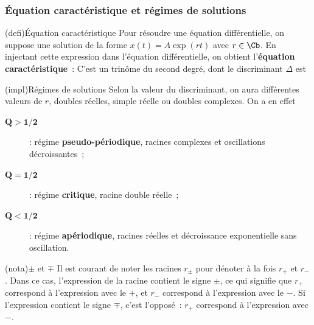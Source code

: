\documentclass[../../main/main.tex]{subfiles}
\begin{document}
\subsubsection{Équation caractéristique et régimes de solutions}
\begin{tcb}[label=def:eqcarac, sidebyside](defi){Équation caractéristique}
	Pour résoudre une équation différentielle, on suppose une solution de la
	forme $x(t) = A\exp(rt)$ avec $r \in \Cb$. En injectant cette
	expression dans l'équation différentielle, on obtient l'\textbf{équation
		caractéristique}~:
	\tcblower
	C'est un trinôme du second degré, dont le discriminant $\Delta$ est
\end{tcb}
\begin{tcb}[label=impl:eqcarac](impl){Régimes de solutions}
	Selon la valeur du discriminant, on aura différentes valeurs de $r$,
	doubles réelles, simple réelle ou doubles complexes. On a en effet
	\vspace{-15pt}
	\begin{description}
		\item[$\mathbf{Q > 1/2}$] : régime \textbf{pseudo-périodique},
		      racines complexes et oscillations décroissantes~;
		\item[$\mathbf{Q = 1/2}$] : régime \textbf{critique}, racine double
		      réelle~;
		\item[$\mathbf{Q < 1/2}$] : régime \textbf{apériodique}, racines
		      réelles et décroissance exponentielle sans oscillation.
	\end{description}
\end{tcb}

\begin{tcb}[label=nota:pm](nota){$\pm$ et $\mp$}
	Il est courant de noter les racines $r_\pm$ pour dénoter à la fois $r_+$ et
	$r_-$. Dans ce cas, l'expression de la racine contient le signe $\pm$, ce
	qui signifie que $r_+$ correspond à l'expression avec le $+$, et $r_-$
	correspond à l'expression avec le $-$.
	\smallbreak
	Si l'expression contient le signe $\mp$, c'est l'opposé~: $r_+$ correspond à
	l'expression avec $-$.
\end{tcb}
\end{document}
